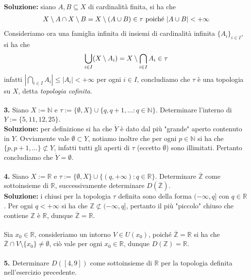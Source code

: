 \documentclass{article}
\begin{document}
\textbf{Soluzione:} siano $A, B \subseteq X$ di cardinalità finita, si ha che
\begin{gather}
    X \setminus A \cap X \setminus B = X \setminus (A \cup B) \in \tau \text{ poiché } |A \cup B| < +\infty \notag
\end{gather}Consideriamo ora una famiglia infinita di insiemi di cardinalità infinita $\{ A_i \}_{i \in I}$, si ha che
\begin{gather}
    \bigcup_{i \in I} (X \setminus A_i) = X \setminus \bigcap_{i \in I} A_i \in \tau \notag
\end{gather}
infatti $|\bigcap_{i \in I} A_i| \leq |A_i| < +\infty$ per ogni $i \in I$, concludiamo che $\tau$ è una topologia su $X$, detta \textit{topologia cofinita}. \\ \\
\textbf{3.} Siano $X := \mathbb{N}$ e $\tau := \{ \emptyset, X \} \cup \{q, q+1, \dots : q \in \mathbb{N} \}$. Determinare l'interno di $Y := \{ 5, 11, 12, 25 \}$. \\

\textbf{Soluzione:} per definizione si ha che $\mathring{Y}$ è dato dal più "grande" aperto contenuto in $Y$. Ovviamente vale $\emptyset \subset Y$, notiamo inoltre che per ogni $p \in \mathbb{N}$ si ha che $\{ p, p+1, \dots \} \not\subset Y$, infatti tutti gli aperti di $\tau$ (eccetto $\emptyset$) sono illimitati. Pertanto concludiamo che $\mathring{Y} = \emptyset$. \\ \\
\textbf{4.} Siano $X := \mathbb{R}$ e $\tau := \{ \emptyset, X \} \cup \{ (q, +\infty) : q \in \mathbb{R} \}$. Determinare $\overline{\mathbb{Z}}$ come sottoinsieme di $\mathbb{R}$, successivamente determinare $D(\mathbb{\overline{Z}})$. \\

\textbf{Soluzione:} i chiusi per la topologia $\tau$ definita sono della forma $(-\infty, q]$ con $q \in \mathbb{R}$. Per ogni $q < +\infty$ si ha che $\mathbb{Z} \not\subset (-\infty, q]$, pertanto il più "piccolo" chiuso che contiene $\mathbb{Z}$ è $\mathbb{R}$, dunque $\overline{\mathbb{Z}} = \mathbb{R}$. \\ \\
Sia $x_0 \in \mathbb{R}$, consideriamo un intorno $V \in U(x_0)$, poiché $\overline{\mathbb{Z}} = \mathbb{R}$ si ha che $\overline{\mathbb{Z}} \cap V \setminus \{ x_0 \} \neq \emptyset$, ciò vale per ogni $x_0 \in \mathbb{R}$, dunque $D(\mathbb{Z}) = \mathbb{R}$. \\ \\
\textbf{5.} Determinare $D([4, 9])$ come sottoinsieme di $\mathbb{R}$ per la topologia definita nell'esercizio precedente. \\
\end{document}
